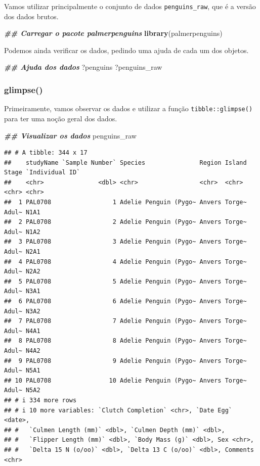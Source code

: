 \documentclass[
]{article}
\newenvironment{Shaded}{\begin{snugshade}}{\end{snugshade}}
\newcommand{\DocumentationTok}[1]{\textcolor[rgb]{0.56,0.35,0.01}{\textbf{\textit{#1}}}}
\newcommand{\FunctionTok}[1]{\textcolor[rgb]{0.13,0.29,0.53}{\textbf{#1}}}
\newcommand{\NormalTok}[1]{#1}
\begin{document}
Vamos utilizar principalmente o conjunto de dados \texttt{penguins\_raw}, que é a versão dos dados brutos.

\begin{Shaded}
\begin{Highlighting}[]
\DocumentationTok{\#\# Carregar o pacote palmerpenguins}
\FunctionTok{library}\NormalTok{(palmerpenguins)}
\end{Highlighting}
\end{Shaded}

Podemos ainda verificar os dados, pedindo uma ajuda de cada um dos objetos.

\begin{Shaded}
\begin{Highlighting}[]
\DocumentationTok{\#\# Ajuda dos dados}
\NormalTok{?penguins}
\NormalTok{?penguins\_raw}
\end{Highlighting}
\end{Shaded}

\hypertarget{glimpse}{%
\subsubsection{glimpse()}\label{glimpse}}

Primeiramente, vamos observar os dados e utilizar a função \texttt{tibble::glimpse()} para ter uma noção geral dos dados.

\begin{Shaded}
\begin{Highlighting}[]
\DocumentationTok{\#\# Visualizar os dados}
\NormalTok{penguins\_raw}
\end{Highlighting}
\end{Shaded}

\begin{verbatim}
## # A tibble: 344 x 17
##    studyName `Sample Number` Species               Region Island Stage `Individual ID`
##    <chr>               <dbl> <chr>                 <chr>  <chr>  <chr> <chr>          
##  1 PAL0708                 1 Adelie Penguin (Pygo~ Anvers Torge~ Adul~ N1A1           
##  2 PAL0708                 2 Adelie Penguin (Pygo~ Anvers Torge~ Adul~ N1A2           
##  3 PAL0708                 3 Adelie Penguin (Pygo~ Anvers Torge~ Adul~ N2A1           
##  4 PAL0708                 4 Adelie Penguin (Pygo~ Anvers Torge~ Adul~ N2A2           
##  5 PAL0708                 5 Adelie Penguin (Pygo~ Anvers Torge~ Adul~ N3A1           
##  6 PAL0708                 6 Adelie Penguin (Pygo~ Anvers Torge~ Adul~ N3A2           
##  7 PAL0708                 7 Adelie Penguin (Pygo~ Anvers Torge~ Adul~ N4A1           
##  8 PAL0708                 8 Adelie Penguin (Pygo~ Anvers Torge~ Adul~ N4A2           
##  9 PAL0708                 9 Adelie Penguin (Pygo~ Anvers Torge~ Adul~ N5A1           
## 10 PAL0708                10 Adelie Penguin (Pygo~ Anvers Torge~ Adul~ N5A2           
## # i 334 more rows
## # i 10 more variables: `Clutch Completion` <chr>, `Date Egg` <date>,
## #   `Culmen Length (mm)` <dbl>, `Culmen Depth (mm)` <dbl>,
## #   `Flipper Length (mm)` <dbl>, `Body Mass (g)` <dbl>, Sex <chr>,
## #   `Delta 15 N (o/oo)` <dbl>, `Delta 13 C (o/oo)` <dbl>, Comments <chr>
\end{verbatim}
\end{document}
